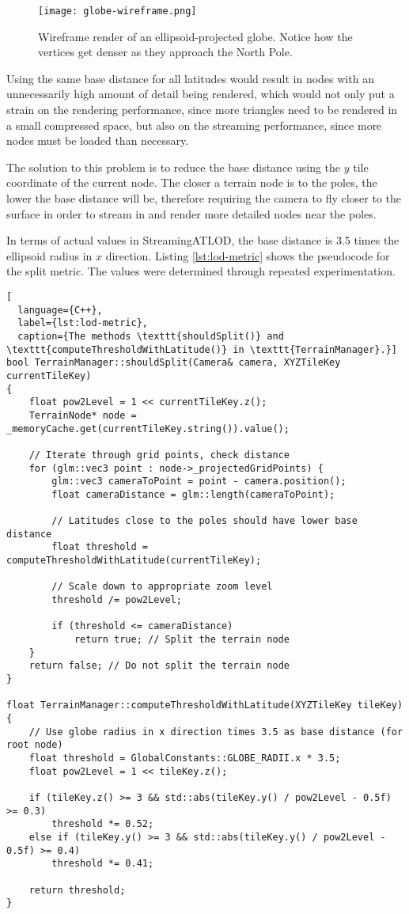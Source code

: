 \begin{figure}[H]
  \centering
  \texttt{[image: globe-wireframe.png]}
  \caption{Wireframe render of an ellipsoid-projected globe. Notice how the vertices get denser as they approach the North Pole.}\label{fig:globe-wireframe}
\end{figure}

Using the same base distance for all latitudes would result in 
nodes with an unnecessarily high amount of detail being rendered, 
which would not only put a strain on the rendering performance,
since more triangles need to be rendered in a small compressed space,
but also on the streaming performance, since more nodes must be loaded than 
necessary.

The solution to this problem is to reduce 
the base distance using the $y$ tile coordinate of the current node.
The closer a terrain node is to the poles, the lower the base distance will be,
therefore requiring the camera to fly closer to the surface in order to stream 
in and render more detailed nodes near the poles.

In terms of actual values in StreamingATLOD, the base distance is
3.5 times the ellipsoid radius in $x$ direction.
Listing \ref{lst:lod-metric} shows the pseudocode for the split metric.
The values were determined through repeated experimentation.

\begin{lstlisting}[
  language={C++},
  label={lst:lod-metric},
  caption={The methods \texttt{shouldSplit()} and \texttt{computeThresholdWithLatitude()} in \texttt{TerrainManager}.}]
bool TerrainManager::shouldSplit(Camera& camera, XYZTileKey currentTileKey)
{
    float pow2Level = 1 << currentTileKey.z();
    TerrainNode* node = _memoryCache.get(currentTileKey.string()).value();

    // Iterate through grid points, check distance
    for (glm::vec3 point : node->_projectedGridPoints) {
        glm::vec3 cameraToPoint = point - camera.position();
        float cameraDistance = glm::length(cameraToPoint);

        // Latitudes close to the poles should have lower base distance
        float threshold = computeThresholdWithLatitude(currentTileKey);

        // Scale down to appropriate zoom level
        threshold /= pow2Level;

        if (threshold <= cameraDistance)
            return true; // Split the terrain node
    }
    return false; // Do not split the terrain node
}

float TerrainManager::computeThresholdWithLatitude(XYZTileKey tileKey)
{
    // Use globe radius in x direction times 3.5 as base distance (for root node)
    float threshold = GlobalConstants::GLOBE_RADII.x * 3.5;
    float pow2Level = 1 << tileKey.z();

    if (tileKey.z() >= 3 && std::abs(tileKey.y() / pow2Level - 0.5f) >= 0.3)
        threshold *= 0.52;
    else if (tileKey.y() >= 3 && std::abs(tileKey.y() / pow2Level - 0.5f) >= 0.4)
        threshold *= 0.41;

    return threshold;
}
\end{lstlisting}

